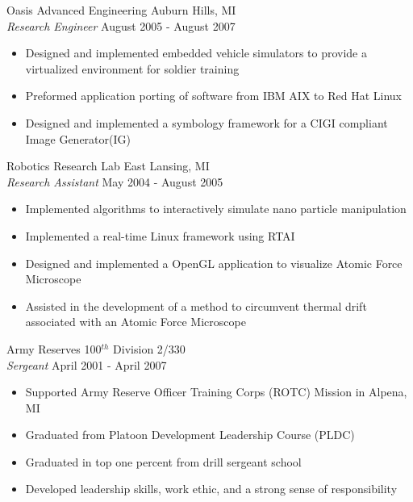 \documentclass[line]{res}
\begin{document}
\begin{resume}
    \vspace{-2mm}
    Oasis Advanced Engineering \hfill Auburn Hills, MI\\
    {\sl Research Engineer} \hfill August 2005 - August 2007
    \vspace{1mm}
    \begin{itemize} 
      \item Designed and implemented embedded vehicle simulators to 
      provide a virtualized environment for soldier training  
      \item Preformed application porting of software from IBM AIX to Red Hat
      Linux
      \item Designed and implemented a symbology framework for a CIGI compliant
      Image Generator(IG)
    \end{itemize}

    \vspace{-2mm}
    Robotics Research Lab \hfill East Lansing, MI\\
    {\sl Research Assistant} \hfill May 2004 - August 2005
    \vspace{1mm}
    \begin{itemize} 
      \item Implemented algorithms to interactively simulate nano
        particle manipulation
      \item Implemented a real-time Linux framework using RTAI
      \item Designed and implemented a OpenGL application to visualize Atomic Force Microscope 
      \item Assisted in the development of a method to circumvent thermal drift
      associated with an Atomic Force Microscope
    \end{itemize}

    \vspace{-2mm}
    Army Reserves \hfill 100$^{th}$ Division 2/330\\
    {\sl Sergeant} \hfill April 2001 - April 2007
    \vspace{1mm}
    \begin{itemize} 
      \item Supported Army Reserve Officer Training Corps (ROTC) Mission in Alpena, MI
      \item Graduated from Platoon Development Leadership Course (PLDC)
      \item Graduated in top one percent from drill sergeant school
      \item Developed leadership skills, work ethic, and a strong sense of
      responsibility      
    \end{itemize}


\end{resume}
\end{document}
